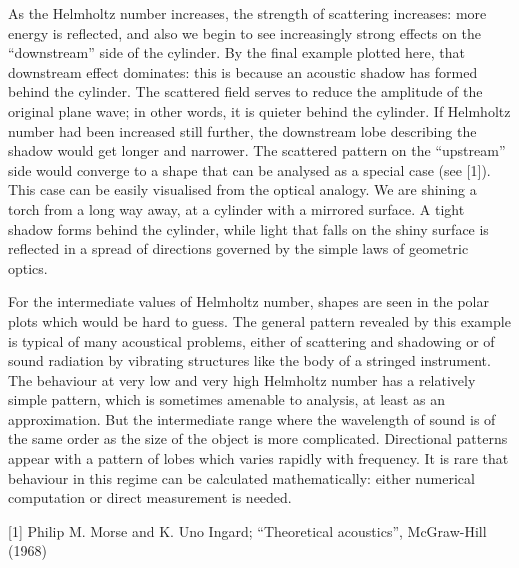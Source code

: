   As the Helmholtz number increases, the strength of scattering increases: more 
  energy is reflected, and also we begin to see increasingly strong effects on 
  the ``downstream'' side of the cylinder. By the final example plotted here, 
  that downstream effect dominates: this is because an acoustic shadow has 
  formed behind the cylinder. The scattered field serves to reduce the 
  amplitude of the original plane wave; in other words, it is quieter behind 
  the cylinder. If Helmholtz number had been increased still further, the 
  downstream lobe describing the shadow would get longer and narrower. The 
  scattered pattern on the ``upstream'' side would converge to a shape that can 
  be analysed as a special case (see [1]). This case can be easily visualised 
  from the optical analogy. We are shining a torch from a long way away, at a 
  cylinder with a mirrored surface. A tight shadow forms behind the cylinder, 
  while light that falls on the shiny surface is reflected in a spread of 
  directions governed by the simple laws of geometric optics. 

  For the intermediate values of Helmholtz number, shapes are seen in the polar 
  plots which would be hard to guess. The general pattern revealed by this 
  example is typical of many acoustical problems, either of scattering and 
  shadowing or of sound radiation by vibrating structures like the body of a 
  stringed instrument. The behaviour at very low and very high Helmholtz number 
  has a relatively simple pattern, which is sometimes amenable to analysis, at 
  least as an approximation. But the intermediate range where the wavelength of 
  sound is of the same order as the size of the object is more complicated. 
  Directional patterns appear with a pattern of lobes which varies rapidly with 
  frequency. It is rare that behaviour in this regime can be calculated 
  mathematically: either numerical computation or direct measurement is needed. 



  \sectionreferences{}[1] Philip M. Morse and K. Uno Ingard; ``Theoretical 
  acoustics'', McGraw-Hill (1968) 